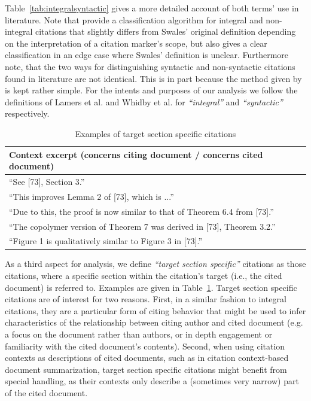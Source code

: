 Table~\ref{tab:integralsyntactic} gives a more detailed account of both terms' use in literature. Note that \cite{Lamers2018} provide a classification algorithm for integral and non-integral citations that slightly differs from Swales' original definition depending on the interpretation of a citation marker's scope, but also gives a clear classification in an edge case where Swales' definition is unclear. Furthermore note, that the two ways for distinguishing syntactic and non-syntactic citations found in literature are not identical. This is in part because the method given by \cite{Abujbara2012} is kept rather simple. For the intents and purposes of our analysis we follow the definitions of Lamers et al. and Whidby et al. for \emph{``integral''} and \emph{``syntactic''} respectively.

\begin{table}
\centering
    \caption{Examples of target section specific citations}
    \label{tab:secspec}
\begin{center}
    \begin{tabular}{l}
    \toprule
    Context excerpt ({\color{UniBlue}concerns citing document} / {\color{RandomRed}concerns cited document}) \\
    \midrule
    ``See [73], {\color{RandomRed}Section 3}.'' \\
    ``This improves {\color{RandomRed}Lemma 2} of [73], which is ...'' \\
    ``Due to this, the proof is now similar to that of {\color{RandomRed}Theorem 6.4} from [73].'' \\
    ``The copolymer version of {\color{UniBlue}Theorem 7} was derived in [73], {\color{RandomRed}Theorem 3.2}.''  \\
    ``{\color{UniBlue}Figure 1} is qualitatively similar to {\color{RandomRed}Figure 3} in [73].'' \\
    \bottomrule
    \end{tabular}
\end{center}
\end{table}

As a third aspect for analysis, we define \emph{``target section specific''} citations as those citations, where a specific section within the citation's target (i.e., the cited document) is referred to. Examples are given in Table~\ref{tab:secspec}. Target section specific citations are of interest for two reasons. First, in a similar fashion to integral citations, they are a particular form of citing behavior that might be used to infer characteristics of the relationship between citing author and cited document (e.g. a focus on the document rather than authors, or in depth engagement or familiarity with the cited document's contents). Second, when using citation contexts as descriptions of cited documents, such as in citation context-based document summarization, target section specific citations might benefit from special handling, as their contexts only describe a (sometimes very narrow) part of the cited document.

